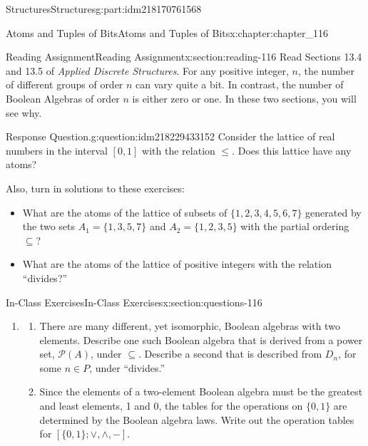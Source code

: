 \documentclass[oneside,10pt,]{book}
\numberwithin{equation}{section}
\begin{document}
\begin{partptx}{Structures}{}{Structures}{}{}{g:part:idm218170761568}
%
\begin{chapterptx}{Atoms and Tuples of Bits}{}{Atoms and Tuples of Bits}{}{}{x:chapter:chapter_116}
%
%
%
\typeout{************************************************}
\typeout{************************************************}
%
\begin{sectionptx}{Reading Assignment}{}{Reading Assignment}{}{}{x:section:reading-116}
Read Sections 13.4 and 13.5 of \emph{Applied Discrete Structures}. For any positive integer, \(n\), the number of different groups of order  \(n\) can vary quite a bit. In contrast, the number of Boolean Algebras of order  \(n\) is either zero or one. In these two sections, you will see why.%
\begin{question}{Response Question.}{g:question:idm218229433152}%
Consider the lattice of real numbers in the interval \([0,1]\) with the relation \(\leq\).  Does this lattice have any atoms?%
\end{question}
Also, turn in solutions to these exercises:%
\begin{itemize}[label=\textbullet]
\item{}What are the atoms of the lattice of subsets of \(\{1, 2, 3, 4, 5, 6, 7\}\)  generated by the two sets \(A_1=\{1,3,5,7\}\) and \(A_2=\{1,2,3,5\}\) with the partial ordering \(\subseteq\)?%
\item{}What are the atoms of the lattice of positive integers with the relation ``divides?''%
\end{itemize}
%
\end{sectionptx}
%
%
\typeout{************************************************}
\typeout{************************************************}
%
\begin{sectionptx}{In-Class Exercises}{}{In-Class Exercises}{}{}{x:section:questions-116}
%
\begin{enumerate}[label=\arabic*.]
\item{}%
\begin{enumerate}[label=(\alph*)]
\item{}There are many different, yet isomorphic, Boolean algebras with two elements. Describe one such Boolean algebra that is derived from a power set, \(\mathcal{P}(A)\), under \(\subseteq\). Describe a second that is described from \(D_n\), for some \(n \in  P\), under ``divides.''%
\item{}Since the elements of a two-element Boolean algebra must be the greatest and least elements, 1 and 0, the tables for the operations on \(\{0, 1\}\) are determined by the Boolean algebra laws. Write out the operation tables for \([\{0, 1\}; \lor , \land, -]\).%

\end{enumerate}
\end{enumerate}
\end{sectionptx}
\end{chapterptx}
\end{partptx}
\end{document}

